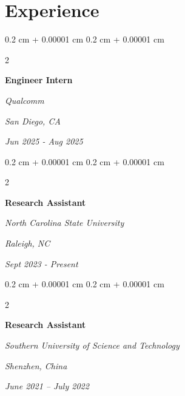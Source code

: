 \documentclass[10pt, letterpaper]{article}
\newenvironment{highlights}{
    \begin{itemize}[
        topsep=0.10 cm,
        parsep=0.10 cm,
        partopsep=0pt,
        itemsep=0pt,
        leftmargin=0.4 cm + 10pt
    ]
}{
    \end{itemize}
} %
\newenvironment{onecolentry}{
    \begin{adjustwidth}{
        0.2 cm + 0.00001 cm
    }{
        0.2 cm + 0.00001 cm
    }
}{
    \end{adjustwidth}
} %
\newenvironment{twocolentry}[2][]{
    \onecolentry
    \def\secondColumn{#2}
    \setcolumnwidth{\fill, 4.5 cm}
    \begin{paracol}{2}
}{
    \switchcolumn \raggedleft \secondColumn
    \end{paracol}
    \endonecolentry
} %
\begin{document}
        




    
    \section{Experience}

        \begin{twocolentry}{
        \textit{San Diego, CA}    
            
        \textit{Jun 2025 - Aug 2025}}
            \textbf{Engineer Intern}
            
            \textit{Qualcomm}
        \end{twocolentry}



        \vspace{0.1 cm}

        
        \begin{twocolentry}{
        \textit{Raleigh, NC}    
            
        \textit{Sept 2023 - Present}}
            \textbf{Research Assistant}
            
            \textit{North Carolina State University}
        \end{twocolentry}



        \vspace{0.1 cm}

        \begin{twocolentry}{
        \textit{Shenzhen, China}    
            
        \textit{June 2021 – July 2022}}
            \textbf{Research Assistant}
            
            \textit{Southern University of Science and Technology}
        \end{twocolentry}
        
        \vspace{0.1 cm}
\end{document}
